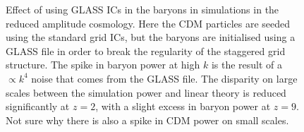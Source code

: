 \documentclass[]{article}
\begin{document}
\begin{figure}[h]
        \caption{Effect of using GLASS ICs in the baryons in simulations in the reduced
amplitude cosmology. Here the CDM particles are
seeded using the standard grid ICs, but the baryons are initialised using a GLASS file
in order to break the regularity of the staggered grid structure. The spike in baryon
power at high $k$ is the result of a $\propto k^4$ noise that comes from the GLASS file.
The disparity on large scales between the simulation power and linear theory is reduced
significantly at $z=2$, with a slight excess in baryon power at $z=9$. Not sure why there is
also a spike in CDM power on small scales.}
\end{figure}
\clearpage
\end{document}
